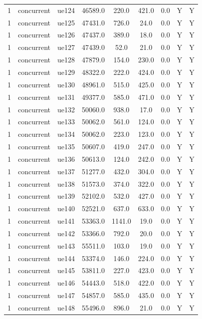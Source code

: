 \begin{table}[ht]
\begin{tabular}{|c|c|c|c|c|c|c|c|c|}
1 & concurrent & ue124 & 46589.0 & 220.0 & 421.0 & 0.0 & Y & Y \\
1 & concurrent & ue125 & 47431.0 & 726.0 & 24.0 & 0.0 & Y & Y \\
1 & concurrent & ue126 & 47437.0 & 389.0 & 18.0 & 0.0 & Y & Y \\
1 & concurrent & ue127 & 47439.0 & 52.0 & 21.0 & 0.0 & Y & Y \\
1 & concurrent & ue128 & 47879.0 & 154.0 & 230.0 & 0.0 & Y & Y \\
1 & concurrent & ue129 & 48322.0 & 222.0 & 424.0 & 0.0 & Y & Y \\
1 & concurrent & ue130 & 48961.0 & 515.0 & 425.0 & 0.0 & Y & Y \\
1 & concurrent & ue131 & 49377.0 & 585.0 & 471.0 & 0.0 & Y & Y \\
1 & concurrent & ue132 & 50060.0 & 938.0 & 17.0 & 0.0 & Y & Y \\
1 & concurrent & ue133 & 50062.0 & 561.0 & 124.0 & 0.0 & Y & Y \\
1 & concurrent & ue134 & 50062.0 & 223.0 & 123.0 & 0.0 & Y & Y \\
1 & concurrent & ue135 & 50607.0 & 419.0 & 247.0 & 0.0 & Y & Y \\
1 & concurrent & ue136 & 50613.0 & 124.0 & 242.0 & 0.0 & Y & Y \\
1 & concurrent & ue137 & 51277.0 & 432.0 & 304.0 & 0.0 & Y & Y \\
1 & concurrent & ue138 & 51573.0 & 374.0 & 322.0 & 0.0 & Y & Y \\
1 & concurrent & ue139 & 52102.0 & 532.0 & 427.0 & 0.0 & Y & Y \\
1 & concurrent & ue140 & 52521.0 & 637.0 & 633.0 & 0.0 & Y & Y \\
1 & concurrent & ue141 & 53363.0 & 1141.0 & 19.0 & 0.0 & Y & Y \\
1 & concurrent & ue142 & 53366.0 & 792.0 & 20.0 & 0.0 & Y & Y \\
1 & concurrent & ue143 & 55511.0 & 103.0 & 19.0 & 0.0 & Y & Y \\
1 & concurrent & ue144 & 53374.0 & 146.0 & 224.0 & 0.0 & Y & Y \\
1 & concurrent & ue145 & 53811.0 & 227.0 & 423.0 & 0.0 & Y & Y \\
1 & concurrent & ue146 & 54443.0 & 518.0 & 422.0 & 0.0 & Y & Y \\
1 & concurrent & ue147 & 54857.0 & 585.0 & 435.0 & 0.0 & Y & Y \\
1 & concurrent & ue148 & 55496.0 & 896.0 & 21.0 & 0.0 & Y & Y \\

\end{tabular}
\end{table}
